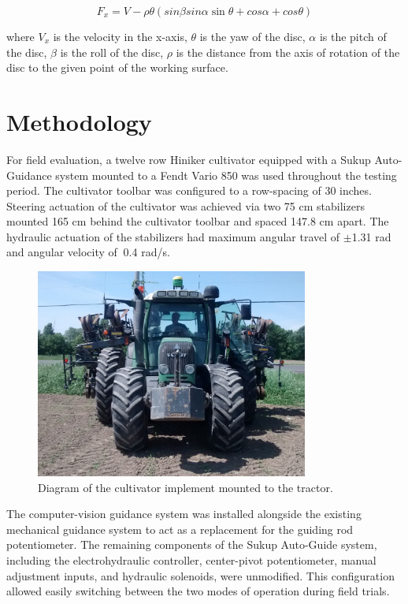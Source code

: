 \documentclass[authoryear]{elsarticle}
\begin{document}
\begin{equation}
  F_x = V - \rho\theta(sin \beta sin \alpha \sin \theta + cos \alpha +
  cos \theta)
  \label{eq:horizontal_force}
\end{equation}
\begin{flushleft}
where $V_x$ is the velocity in the x-axis, $\theta$ is the yaw of the
disc, $\alpha$ is the pitch of the
disc, $\beta$ is the roll of the disc, $\rho$ is the distance from
the axis of rotation of the disc to the given point of the working surface.
\end{flushleft}

\section{Methodology}
For field evaluation, a twelve row Hiniker cultivator equipped with a
Sukup Auto-Guidance system mounted to a Fendt Vario 850 was used
throughout the testing period. The cultivator toolbar was configured
to a row-spacing of 30 inches. Steering actuation of the cultivator
was achieved via two 75 cm stabilizers mounted 165 cm behind the
cultivator toolbar and spaced 147.8 cm apart. The hydraulic actuation
of the stabilizers had maximum angular travel of $\pm$1.31 rad and angular
velocity of $~$0.4 rad/s.

\begin{figure}[H]
  \centering
  \includegraphics[width=0.8\textwidth,natwidth=610,natheight=642]{fendt_front.jpg}
  \caption{Diagram of the cultivator implement mounted to the tractor.}
\end{figure}

The computer-vision guidance system was installed alongside the
existing mechanical guidance system to act as a replacement for the
guiding rod potentiometer. The remaining components of the Sukup
Auto-Guide system, including the electrohydraulic controller,
center-pivot potentiometer, manual adjustment inputs, and hydraulic
solenoids, were unmodified. This configuration allowed easily
switching between the two modes of operation during field trials.
\end{document}

